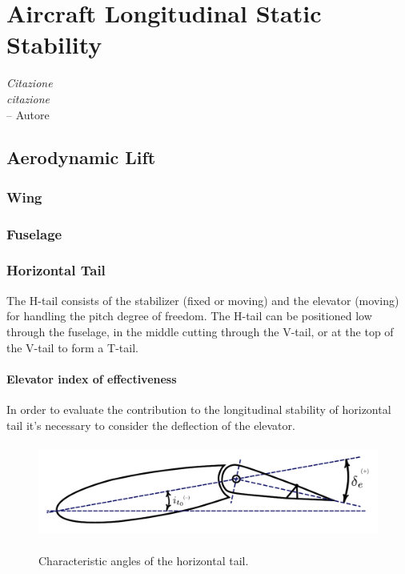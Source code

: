 \chapter{Aircraft Longitudinal Static Stability}
\label{ch:workobject}
\begin{flushright}
	{\smaller
		\textit{Citazione\\ citazione}\\
		-- Autore}
\end{flushright}

\section{Aerodynamic Lift}
\subsection{Wing}
\subsection{Fuselage}
\subsection{Horizontal Tail}
The H-tail consists of the stabilizer (fixed or moving) and the elevator (moving) for handling the pitch degree of freedom. The H-tail can be positioned low through the fuselage, in the middle cutting through the V-tail, or at the top of the V-tail to form a T-tail. \cite{kundu}
\subsubsection{Elevator index of effectiveness}
 In order to evaluate the contribution to the longitudinal stability of horizontal tail it's necessary to consider the deflection of the elevator. 
		
\begin{figure}[H]
\centering
{\includegraphics[height=3.09cm]{Immagini/horizontal_tail_profile_deltaE.pdf}} 
\label{htailangle}
\caption{Characteristic angles of the horizontal tail.}
\end{figure} 		
		

